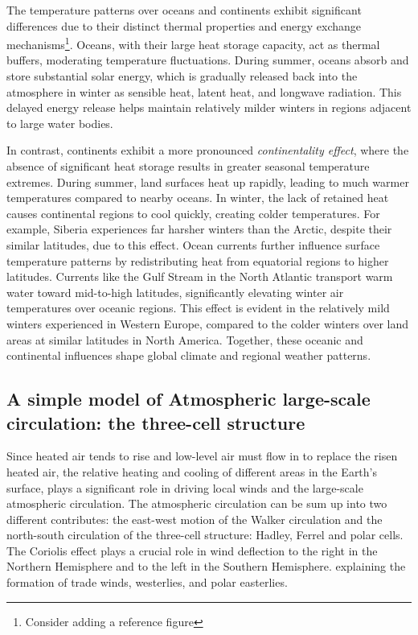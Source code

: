 The temperature patterns over oceans and continents exhibit significant differences due to their distinct thermal properties and energy exchange mechanisms\footnote{Consider adding a reference figure}.
Oceans, with their large heat storage capacity, act as thermal buffers, moderating temperature fluctuations.
During summer, oceans absorb and store substantial solar energy, which is gradually released back into the atmosphere in winter as sensible heat, latent heat, and longwave radiation. This delayed energy release helps maintain relatively milder winters in regions adjacent to large water bodies.

In contrast, continents exhibit a more pronounced \emph{continentality effect}, where the absence of significant heat storage results in greater seasonal temperature extremes. During summer, land surfaces heat up rapidly, leading to much warmer temperatures compared to nearby oceans. In winter, the lack of retained heat causes continental regions to cool quickly, creating colder temperatures. For example, Siberia experiences far harsher winters than the Arctic, despite their similar latitudes, due to this effect.
Ocean currents further influence surface temperature patterns by redistributing heat from equatorial regions to higher latitudes. Currents like the Gulf Stream in the North Atlantic transport warm water toward mid-to-high latitudes, significantly elevating winter air temperatures over oceanic regions. This effect is evident in the relatively mild winters experienced in Western Europe, compared to the colder winters over land areas at similar latitudes in North America. Together, these oceanic and continental influences shape global climate and regional weather patterns.

\subsection{A simple model of Atmospheric large-scale circulation: the three-cell structure}
\label{subsec:three-cell-struct}

Since heated air tends to rise and low-level air must flow in to replace the risen heated air, the relative heating and cooling of different areas in the Earth’s surface, plays a significant role in driving local winds and the large-scale atmospheric circulation.
The atmospheric circulation can be sum up into two different contributes: the east-west motion of the Walker circulation and the north-south circulation of the
three-cell structure: Hadley, Ferrel and polar cells.
The Coriolis effect plays a crucial role in wind deflection to the right in the Northern Hemisphere and to the left in the Southern Hemisphere. explaining the formation of trade winds, westerlies, and polar easterlies.

